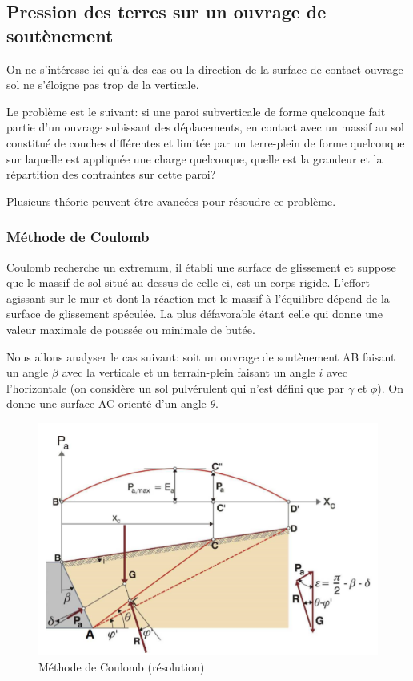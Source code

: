     \subsection{Pression des terres sur un ouvrage de soutènement}
    
        On ne s'intéresse ici qu'à des cas ou la direction de la surface de contact ouvrage-sol ne s'éloigne pas trop de la verticale. 
        
        Le problème est le suivant: si une paroi subverticale de forme quelconque fait partie d'un ouvrage subissant des déplacements, en contact avec un massif au sol constitué de couches différentes et limitée par un terre-plein de forme quelconque sur laquelle est appliquée une charge quelconque, quelle est la grandeur et la répartition des contraintes sur cette paroi? 
        
        Plusieurs théorie peuvent être avancées pour résoudre ce problème.
        
        \subsubsection{Méthode de Coulomb}
        
        Coulomb recherche un extremum, il établi une surface de glissement et suppose que le massif de sol situé au-dessus de celle-ci, est un corps rigide. L'effort agissant sur le mur et dont la réaction met le massif à l'équilibre dépend de la surface de glissement spéculée. La plus défavorable étant celle qui donne une valeur maximale de poussée ou minimale de butée. 
        
        Nous allons analyser le cas suivant: soit un ouvrage de soutènement AB faisant un angle $\beta$ avec la verticale et un terrain-plein faisant un angle $i$ avec l'horizontale (on considère un sol pulvérulent qui n'est défini que par $\gamma$ et $\phi$). On donne une surface AC orienté d'un angle $\theta$. 
        
        \begin{figure}[h!]
            \centering
            \includegraphics[scale=1]{Holeyman/images/H47.PNG}
            \caption{Méthode de Coulomb (résolution) }
        \end{figure}
        
